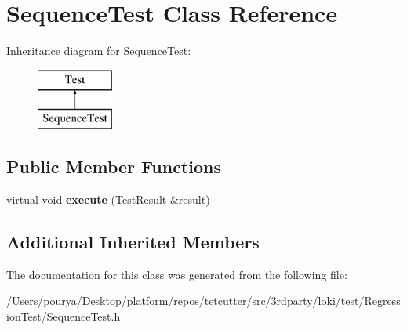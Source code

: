 \hypertarget{classSequenceTest}{}\section{Sequence\+Test Class Reference}
\label{classSequenceTest}
Inheritance diagram for Sequence\+Test\+:\begin{figure}[H]
\begin{center}
\leavevmode
\includegraphics[height=2.000000cm]{classSequenceTest}
\end{center}
\end{figure}
\subsection*{Public Member Functions}
\begin{DoxyCompactItemize}
\item 
\hypertarget{classSequenceTest_abedef74741257368ba6289c6253eb414}{}virtual void {\bfseries execute} (\hyperlink{classTestResult}{Test\+Result} \&result)\label{classSequenceTest_abedef74741257368ba6289c6253eb414}

\end{DoxyCompactItemize}
\subsection*{Additional Inherited Members}


The documentation for this class was generated from the following file\+:\begin{DoxyCompactItemize}
\item 
/\+Users/pourya/\+Desktop/platform/repos/tetcutter/src/3rdparty/loki/test/\+Regression\+Test/Sequence\+Test.\+h\end{DoxyCompactItemize}
